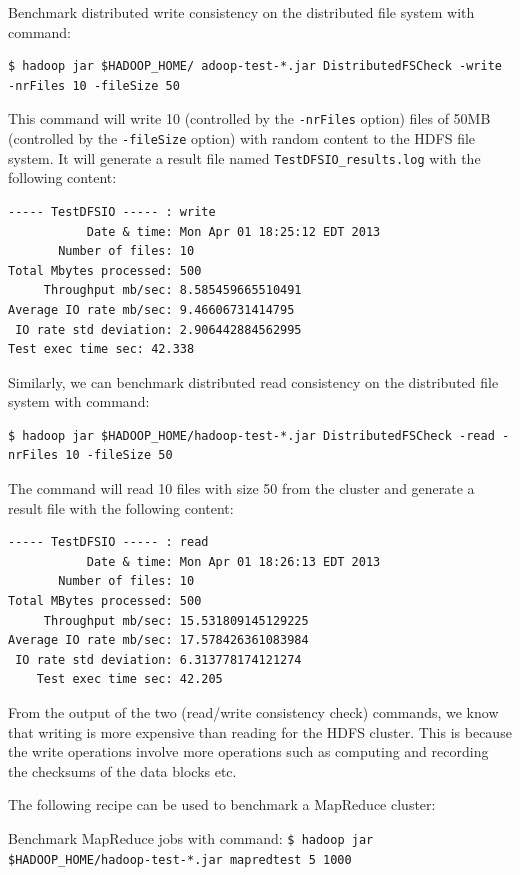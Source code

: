 Benchmark distributed write consistency on the distributed file system with command:
\lstset{style=bashstyle}
\begin{lstlisting}
$ hadoop jar $HADOOP_HOME/ adoop-test-*.jar DistributedFSCheck -write -nrFiles 10 -fileSize 50
\end{lstlisting}
This command will write 10 (controlled by the \verb|-nrFiles| option) files of 50MB (controlled by the \verb|-fileSize| option) with random content to the HDFS file system. It will generate a result file named \verb|TestDFSIO_results.log| with the following content:
\lstset{style=bashstyle}
\begin{lstlisting}
----- TestDFSIO ----- : write
           Date & time: Mon Apr 01 18:25:12 EDT 2013
       Number of files: 10
Total Mbytes processed: 500
     Throughput mb/sec: 8.585459665510491
Average IO rate mb/sec: 9.46606731414795
 IO rate std deviation: 2.906442884562995
Test exec time sec: 42.338
\end{lstlisting}

Similarly, we can benchmark distributed read consistency on the distributed file system with command:
\lstset{style=bashstyle}
\begin{lstlisting}
$ hadoop jar $HADOOP_HOME/hadoop-test-*.jar DistributedFSCheck -read -nrFiles 10 -fileSize 50
\end{lstlisting}

The command will read 10 files with size 50 from the cluster and generate a result file with the following content:
\lstset{style=bashstyle}
\begin{lstlisting}
----- TestDFSIO ----- : read
           Date & time: Mon Apr 01 18:26:13 EDT 2013
       Number of files: 10
Total MBytes processed: 500
     Throughput mb/sec: 15.531809145129225
Average IO rate mb/sec: 17.578426361083984
 IO rate std deviation: 6.313778174121274
    Test exec time sec: 42.205
\end{lstlisting}

From the output of the two (read/write consistency check) commands, we know that writing is more expensive than reading for the HDFS cluster. This is because the write operations involve more operations such as computing and recording the checksums of the data blocks etc.

The following recipe can be used to benchmark a MapReduce cluster:

Benchmark MapReduce jobs with command:
\verb|$ hadoop jar $HADOOP_HOME/hadoop-test-*.jar mapredtest 5 1000|


